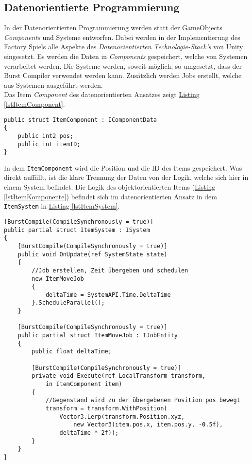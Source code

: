 \subsection{Datenorientierte Programmierung}
In der Datenorientierten Programmierung werden statt der GameObjects \textit{Components} und Systeme entworfen. Dabei werden in der Implementierung des Factory Spiels alle Aspekte des \textit{Datenorientierten Technologie-Stack's} von Unity eingesetzt. Es werden die Daten in \textit{Components} gespeichert, welche von Systemen verarbeitet werden. Die Systeme werden, soweit möglich, so umgesetzt, dass der Burst Compiler verwendet werden kann. Zusätzlich werden Jobs erstellt, welche aus Systemen ausgeführt werden.\\
Das Item \textit{Component} des datenorientierten Ansatzes zeigt \hyperref[lstItemComponent]{Listing \ref*{lstItemComponent}}.
\begin{lstlisting}[style=code, caption={[Item \textit{Component} im datenorientierten Ansatz]Item \textit{Component} im datenorientierten Ansatz. Es werden nur die Daten des Items gespeichert. Die Logik des Items befindet sich in einem System.}, label=lstItemComponent]
public struct ItemComponent : IComponentData
{
    public int2 pos;
    public int itemID;
}
\end{lstlisting}
In dem \texttt{ItemComponent} wird die Position und die ID des Items gespeichert. Was direkt auffällt, ist die klare Trennung der Daten von der Logik, welche sich hier in einem System befindet. Die Logik des objektorientierten Items (\hyperref[lstItemKomponente]{Listing \ref*{lstItemKomponente}}) befindet sich im datenorientierten Ansatz in dem \texttt{ItemSystem} in \hyperref[lstItemSystem]{Listing \ref*{lstItemSystem}}.
\begin{lstlisting}[style=code, caption={[Item System im datenorientierten Ansatz.]Item System zum Bewegen von Items im datenorientierten Ansatz. Aus der \texttt{OnUpdate} Methode wird ein Job geschedult, welcher die Items bewegt.}, label=lstItemSystem]
[BurstCompile(CompileSynchronously = true)]
public partial struct ItemSystem : ISystem
{
    [BurstCompile(CompileSynchronously = true)]
    public void OnUpdate(ref SystemState state)
    {
    	//Job erstellen, Zeit übergeben und schedulen
        new ItemMoveJob
        {
            deltaTime = SystemAPI.Time.DeltaTime
        }.ScheduleParallel();
    }

    [BurstCompile(CompileSynchronously = true)]
    public partial struct ItemMoveJob : IJobEntity
    {
        public float deltaTime;
        
        [BurstCompile(CompileSynchronously = true)]
        private void Execute(ref LocalTransform transform,
            in ItemComponent item)
        {
        	//Gegenstand wird zu der übergebenen Position pos bewegt
            transform = transform.WithPosition(
                Vector3.Lerp(transform.Position.xyz,
                    new Vector3(item.pos.x, item.pos.y, -0.5f),
                deltaTime * 2f));
        }
    }
}
\end{lstlisting}
